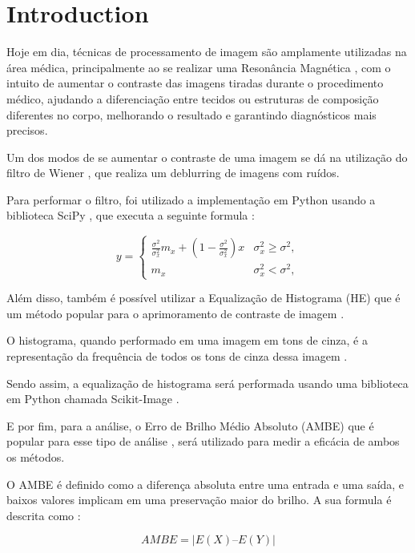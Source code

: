 \documentclass[conference]{IEEEtran}
\begin{document}
\section{Introduction}

Hoje em dia, técnicas de processamento de imagem são amplamente utilizadas na área médica, principalmente ao se realizar uma Resonância Magnética \cite{b1}, com o intuito de aumentar o contraste das imagens tiradas durante o procedimento médico, ajudando a diferenciação entre tecidos ou estruturas de composição diferentes no corpo\cite{b2}, melhorando o resultado e garantindo diagnósticos mais precisos.

Um dos modos de se aumentar o contraste de uma imagem se dá na utilização do filtro de Wiener \cite{b3}, que realiza um deblurring de imagens com ruídos.

Para performar o filtro, foi utilizado a implementação em Python usando a biblioteca SciPy \cite{b4}, que executa a seguinte formula \cite{b5} :

\begin{equation}
y=\left\{ \begin{array}{cc} \frac{\sigma^{2}}{\sigma_{x}^{2}}m_{x}+\left(1-\frac{\sigma^{2}}{\sigma_{x}^{2}}\right)x & \sigma_{x}^{2}\geq\sigma^{2},\\ m_{x} & \sigma_{x}^{2}<\sigma^{2},\end{array}\right.
\end{equation}

Além disso, também é possível utilizar a Equalização de Histograma (HE) que é um método popular para o aprimoramento de contraste de imagem \cite{b6} \cite{b7} \cite{b8}.

O histograma, quando performado em uma imagem em tons de cinza, é a representação da frequência de todos os tons de cinza dessa imagem \cite{b9}.

Sendo assim, a equalização de histograma será performada usando uma biblioteca em Python chamada Scikit-Image \cite{1-}.

E por fim, para a análise, o Erro de Brilho Médio Absoluto (AMBE) que é popular para esse tipo de análise \cite{11}, será utilizado para medir a eficácia de ambos os métodos.

O AMBE é definido como a diferença absoluta entre uma entrada e uma saída, e baixos valores implicam em uma preservação maior do brilho. A sua formula é descrita como \cite{12}:

\begin{equation}
AMBE=|E(X) – E(Y)|     
\end{equation}
\end{document}
